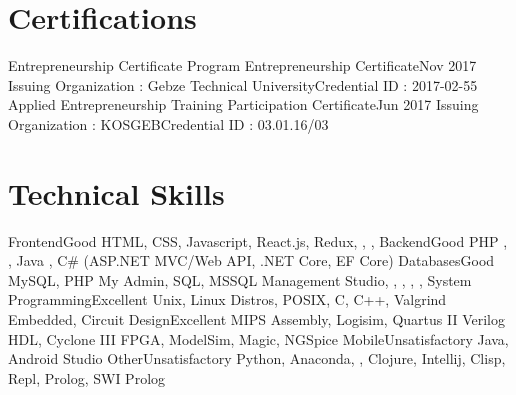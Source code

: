 \documentclass{main} %
\begin{document}
\section{Certifications}
    \resumeSubHeadingListStart
        \resumeSubheading
            {Entrepreneurship Certificate Program Entrepreneurship Certificate}{Nov 2017}
            {Issuing Organization : Gebze Technical University}{Credential ID : 2017-02-55}
        \resumeSubheading
            {Applied Entrepreneurship Training Participation Certificate}{Jun 2017}
            {Issuing Organization : KOSGEB}{Credential ID : 03.01.16/03}
    \resumeSubHeadingListEnd

\section{Technical Skills}
    \resumeSubHeadingListStart %
        \resumeSubheading
            {Frontend}{Good} %
            {HTML, CSS, Javascript, React.js, Redux, {}, {}, {}}{}
        \resumeSubheading
            {Backend}{Good} %
            {PHP {}, {}, Java {}, C\# (ASP.NET MVC/Web API, .NET Core, EF Core)}{}
        \resumeSubheading
            {Databases}{Good} %
            {MySQL, PHP My Admin, SQL, MSSQL Management Studio, {}, {}, {}, {}, {}}{}
        \resumeSubheading
            {System Programming}{Excellent}
            {Unix, Linux Distros, POSIX, C, C++, Valgrind}{}
        \resumeSubheading
            {Embedded, Circuit Design}{Excellent}
            {MIPS Assembly, Logisim, Quartus II Verilog HDL, Cyclone III FPGA, ModelSim, Magic, NGSpice}{}
        \resumeSubheading
            {Mobile}{Unsatisfactory}
            {Java, Android Studio}{}
        \resumeSubheading
            {Other}{Unsatisfactory}
            {Python, Anaconda, {}, Clojure, Intellij, Clisp, Repl, Prolog, SWI Prolog}{}
    \resumeSubHeadingListEnd
\end{document}
